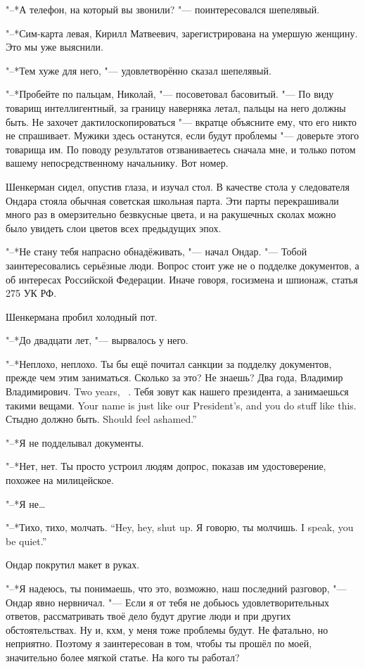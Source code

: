 "--*А телефон, на который вы звонили? "--- поинтересовался шепелявый.

"--*Сим-карта левая, Кирилл Матвеевич, зарегистрирована на умершую женщину.
Это мы уже выяснили.

"--*Тем хуже для него, "--- удовлетворённо сказал шепелявый.

"--*Пробейте по пальцам, Николай, "--- посоветовал басовитый.
"--- По виду товарищ интеллигентный, за границу наверняка летал, пальцы на него должны быть.
Не захочет дактилоскопироваться "--- вкратце объясните ему, что его никто не спрашивает.
Мужики здесь останутся, если будут проблемы "--- доверьте этого товарища им.
По поводу результатов отзваниваетесь сначала мне, и только потом вашему непосредственному начальнику.
Вот номер.

\asterism

Шенкерман сидел, опустив глаза, и изучал стол.
В качестве стола у следователя Ондара стояла обычная советская школьная парта.
Эти парты перекрашивали много раз в омерзительно безвкусные цвета, и на ракушечных сколах можно было увидеть слои цветов всех предыдущих эпох.

"--*Не стану тебя напрасно обнадёживать, "--- начал Ондар.
"--- Тобой заинтересовались серьёзные люди.
Вопрос стоит уже не о подделке документов, а об интересах Российской Федерации.
Иначе говоря, госизмена и шпионаж, статья 275 УК РФ.

Шенкермана пробил холодный пот.

"--*До двадцати лет, "--- вырвалось у него.

"--*Неплохо, неплохо.
Ты бы ещё почитал санкции за подделку документов, прежде чем этим заниматься.
Сколько за это?
Не знаешь?
{Два года, Владимир Владимирович.}
{Two years, \Vladimir\ \Vladimirovich.}
{Тебя зовут как нашего президента, а занимаешься такими вещами.}
{Your name is just like our President's, and you do stuff like this.}
{Стыдно должно быть.}
{Should feel ashamed.''}

"--*Я не подделывал документы.

"--*Нет, нет.
Ты просто устроил людям допрос, показав им удостоверение, похожее на милицейское.

"--*Я не\ldots{}

{"--*Тихо, тихо, молчать.}
{``Hey, hey, shut up.}
{Я говорю, ты молчишь.}
{I speak, you be quiet.''}

Ондар покрутил макет в руках.

"--*Я надеюсь, ты понимаешь, что это, возможно, наш последний разговор, "--- Ондар явно нервничал.
"--- Если я от тебя не добьюсь удовлетворительных ответов, рассматривать твоё дело будут другие люди и при других обстоятельствах.
Ну и, кхм, у меня тоже проблемы будут.
Не фатально, но неприятно.
Поэтому я заинтересован в том, чтобы ты прошёл по моей, значительно более мягкой статье.
На кого ты работал?

